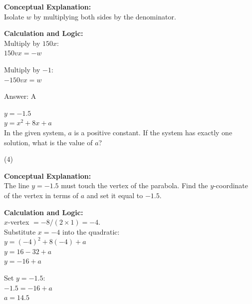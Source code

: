 \documentclass[11pt,paper=a4,answers]{exam}
\begin{document}
\begin{questions}
\begin{solution}
\textbf{Conceptual Explanation:} \\
Isolate $w$ by multiplying both sides by the denominator.

\vspace{20pt}

\textbf{Calculation and Logic:} \\
Multiply by $150x$: \\
$150vx = -w$

\vspace{10pt}

Multiply by $-1$: \\
$-150vx = w$

\vspace{25pt}

Answer: \colorbox{yellow!100}{A}
\end{solution}

\vspace{40pt}

\question
$y = -1.5$ \\
$y = x^2 + 8x + a$ \\
In the given system, $a$ is a positive constant. If the system has exactly one solution, what is the value of $a$?
\begin{tasks}(4)
\end{tasks}

\begin{solution}
\textbf{Conceptual Explanation:} \\
The line $y = -1.5$ must touch the vertex of the parabola. Find the $y$-coordinate of the vertex in terms of $a$ and set it equal to $-1.5$.

\vspace{20pt}

\textbf{Calculation and Logic:} \\
$x$-vertex $= -8 / (2 \times 1) = -4$. \\
Substitute $x = -4$ into the quadratic: \\
$y = (-4)^2 + 8(-4) + a$ \\
$y = 16 - 32 + a$ \\
$y = -16 + a$

\vspace{10pt}

Set $y = -1.5$: \\
$-1.5 = -16 + a$ \\
$a = 14.5$


\end{solution}
\end{questions}
\end{document}
